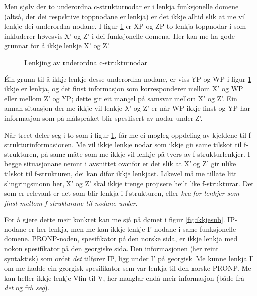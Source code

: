 \documentclass[11pt,a4paper,oneside,draft]{book}
\begin{document}
Men sjølv der to underordna c-strukturnodar er i lenkja funksjonelle
domene (altså, der dei respektive toppnodane er lenkja) er det ikkje
alltid slik at me vil lenkje dei underordna nodane. I figur
\ref{fig:subnode} er XP og ZP to lenkja toppnodar i som inkluderer
høvesvis X' og Z' i dei funksjonelle domena. Her kan me ha gode
grunnar for å ikkje lenkje X' og Z'. 

\begin{figure}[htp]
\centering
   \caption{Lenkjing av underordna c-strukturnodar}
   \label{fig:subnode}
  \end{figure}

Éin grunn til å ikkje lenkje desse underordna nodane, er viss YP og WP
i figur \ref{fig:subnode} ikkje er lenkja, og det finst informasjon
som korresponderer mellom X' og WP eller mellom Z' og YP; dette gir
eit mangel på samsvar mellom X' og Z'.  Ein annan situasjon der me
ikkje vil lenkje X' og Z' er når WP ikkje finst og YP har informasjon
som på målspråket blir spesifisert av nodar under Z'.

Når treet deler seg i to som i figur \ref{fig:subnode}, får me ei
mogleg oppdeling av kjeldene til f-strukturinformasjonen. Me vil ikkje
lenkje nodar som ikkje gir same tilskot til f-strukturen, på same måte
som me ikkje vil lenkje på tvers av f-strukturlenkjer. I begge
situasjonane nemnt i avsnittet ovanfor er det slik at X' og Z' gir
ulike tilskot til f-strukturen, dei kan difor ikkje lenkjast. Likevel
må me tillate litt slingringsmonn her, X' og Z' skal ikkje trenge
projisere heilt like f-strukturar. Det som er relevant er det som blir
lenkja i f-strukturen, eller \emph{kva for lenkjer som finst mellom f-strukturane til nodane under}.

For å gjere dette meir konkret kan me sjå på dømet i figur
\ref{fig:ikkjesub}. IP-nodane er her lenkja, men me kan ikkje lenkje
I'-nodane i same funksjonelle domene. PRONP-noden, spesifikator på den
norske sida, er ikkje lenkja med nokon spesifikator på den georgiske
sida. Den informasjonen (her reint syntaktisk) som ordet \emph{det}
tilfører IP, ligg under I' på georgisk. Me kunne lenkja I' om me hadde
ein georgisk spesifikator som var lenkja til den norske PRONP. Me kan
heller ikkje lenkje Vfin til V, her manglar endå meir informasjon
(både frå \emph{det} og frå \emph{seg}). 
\end{document}
